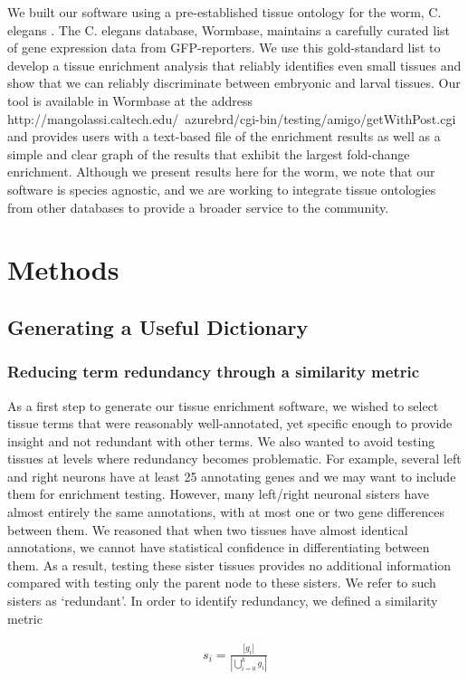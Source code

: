 \documentclass[linenumbers, doublespacing]{bmcart}
\begin{document}
	We built our software using a pre-established tissue ontology for the worm, C. elegans \cite{Lee2003}. The C. elegans  database, Wormbase\cite{Harris2014}, maintains a carefully curated list of gene expression data from GFP-reporters. We use this gold-standard list to develop a tissue enrichment analysis that reliably identifies even small tissues and show that we can reliably discriminate between embryonic and larval tissues. Our tool is available in Wormbase at the address http://mangolassi.caltech.edu/~azurebrd/cgi-bin/testing/amigo/getWithPost.cgi and provides users with a text-based file of the enrichment results as well as a simple and clear graph of the results that exhibit the largest fold-change enrichment. Although we present results here for the worm, we note that our software is species agnostic, and we are working to integrate tissue ontologies from other databases to provide a broader service to the community. 

\section*{Methods}
\subsection*{Generating a Useful Dictionary}
\subsubsection*{Reducing term redundancy through a similarity metric}
As a first step to generate our tissue enrichment software, we wished to select tissue terms that were reasonably well-annotated, yet specific enough to provide insight and not redundant with other terms. We also wanted to avoid testing tissues at levels where redundancy becomes problematic. For example, several left and right neurons have at least 25 annotating genes and we may want to include them for enrichment testing. However, many left/right neuronal sisters have almost entirely the same annotations, with at most one or two gene differences between them. We reasoned that when two tissues have almost identical annotations, we cannot have statistical confidence in differentiating between them. As a result, testing these sister tissues provides no additional information compared with testing only the parent node to these sisters. We refer to such sisters as ‘redundant’. In order to identify redundancy, we defined a similarity metric 

\begin{eqnarray}\label{similarity def}
	s_i = \frac{|g_i|}{|\bigcup_{i= 0}^k g_i|}
\end{eqnarray}
\end{document}
